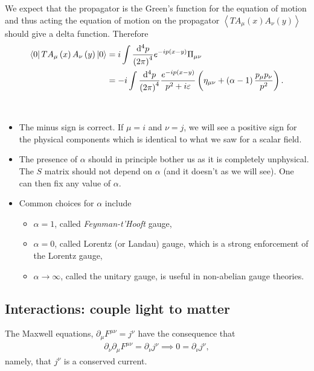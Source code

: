 
We expect that the propagator is the Green's function for the equation of motion and thus acting the equation of motion on the propagator $\left<T A_\mu \left( x \right) A_\nu \left( y \right)  \right>$ should give a delta function. Therefore
\begin{align}
    \bra{0} T A_{\mu}\left( x \right) A_\nu \left( y \right) \ket{0} &= i \int \frac{\dd{^4p}}{\left( 2\pi\right)^4} e^{-ip \left( x - y \right) } \Pi_{\mu \nu} \\
     &= -i \int \frac{\dd{^4p}}{\left( 2\pi\right)^4} \frac{e^{-ip \left( x - y \right) }}{p^2 + i \varepsilon} \left( \eta_{\mu \nu} + \left( \alpha - 1 \right) \frac{p_\mu p_\nu}{p^2} \right)  
.\end{align}

\begin{notes}~
    \begin{itemize}
        \item The minus sign is correct. If $\mu = i$ and $\nu = j$, we will see a positive sign for the physical components which is identical to what we saw for a scalar field.
        \item The presence of $\alpha$ should in principle bother us as it is completely unphysical. The $S$ matrix should not depend on $\alpha$ (and it doesn't as we will see). One can then fix any value of $\alpha$.
        \item Common choices for $\alpha$ include
            \begin{itemize}
                \item $\alpha = 1$, called \textit{Feynman-t'Hooft} gauge,
                \item $\alpha = 0$, called Lorentz (or Landau) gauge, which is a strong enforcement of the Lorentz gauge,
                \item $\alpha \to \infty$, called the unitary gauge, is useful in non-abelian gauge theories.
            \end{itemize}
    \end{itemize}
\end{notes}

\subsection{Interactions: couple light to matter}

The Maxwell equations, $\partial_\mu F^{\mu \nu} = j^{\nu}$ have the consequence that
\begin{align}
    \partial_\nu \partial_\mu F^{\mu \nu} = \partial_\nu j^{\nu} \implies 0 = \partial_\nu j^{\nu}
,\end{align}
namely, that $j^{\nu}$ is a conserved current.

